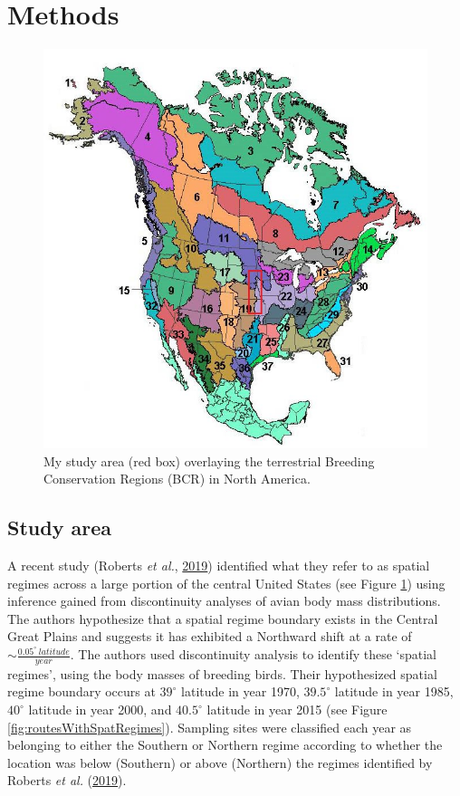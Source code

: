 \documentclass[print]{nuthesis}
\begin{document}
\hypertarget{methods-2}{%
\section{Methods}\label{methods-2}}
\begin{figure}
\includegraphics[width=0.85\linewidth]{.//chapterFiles/discontinuityAnalysis/figsCalledInDiss/mybbox_onBCRmap} \caption{My study area (red box) overlaying the terrestrial Breeding Conservation Regions (BCR) in North America.}\label{fig:studyarea}
\end{figure}
\hypertarget{study-area-1}{%
\subsection{Study area}\label{study-area-1}}

A recent study (Roberts \emph{et al.}, \protect\hyperlink{ref-roberts2019shifting}{2019}) identified what they refer to as spatial regimes across a large portion of the central United States (see Figure \ref{fig:studyarea}) using inference gained from discontinuity analyses of avian body mass distributions. The authors hypothesize that a spatial regime boundary exists in the Central Great Plains and suggests it has exhibited a Northward shift at a rate of \(\sim\frac{0.05^\circ\ latitude}{year}\). The authors used discontinuity analysis to identify these `spatial regimes', using the body masses of breeding birds. Their hypothesized spatial regime boundary occurs at \(39^\circ\) latitude in year 1970, \(39.5^\circ\) latitude in year 1985, \(40^\circ\) latitude in year 2000, and \(40.5^\circ\) latitude in year 2015 (see Figure \ref{fig:routesWithSpatRegimes}). Sampling sites were classified each year as belonging to either the Southern or Northern regime according to whether the location was below (Southern) or above (Northern) the regimes identified by Roberts \emph{et al.} (\protect\hyperlink{ref-roberts2019shifting}{2019}).
\end{document}
